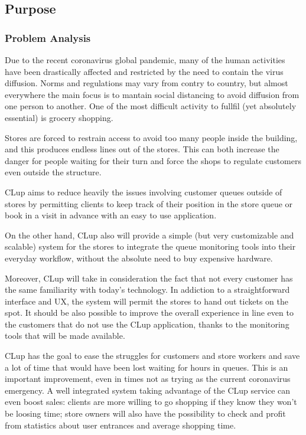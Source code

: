 \subsection{Purpose}

\subsubsection{Problem Analysis}

Due to the recent coronavirus global pandemic, many of the human activities have been drastically affected and restricted by the need to contain the virus diffusion. Norms and regulations may vary from contry to country, but almost everywhere the main focus is to mantain social distancing to avoid diffusion from one person to another.
One of the most difficult activity to fullfil (yet absolutely essential) is grocery shopping.
\medskip

Stores are forced to restrain access to avoid too many people inside the building, and this produces endless lines out of the stores. This can both increase the danger for people waiting for their turn and force the shops to regulate customers even outside the structure.

\medskip

CLup aims to reduce heavily the issues involving customer queues outside of stores by permitting clients to keep track of their position in the store queue or book in a visit in advance with an easy to use application.

\medskip

On the other hand, CLup also will provide a simple (but very customizable and scalable) system for the stores to integrate the queue monitoring tools into their everyday workflow, without the absolute need to buy expensive hardware.

\medskip

Moreover, CLup will take in consideration the fact that not every customer has the same familiarity with today's technology.
In addiction to a straightforward interface and UX, the system will permit the stores to hand out tickets on the spot. It should be also possible to improve the overall experience in line even to the customers that do not use the CLup application, thanks to the monitoring tools that will be made available.

\medskip

CLup has the goal to ease the struggles for customers and store workers and save a lot of time that would have been lost waiting for hours in queues. This is an important improvement, even in times not as trying as the current coronavirus emergency.
A well integrated system taking advantage of the CLup service can even boost sales: clients are more willing to go shopping if they know they won't be loosing time; store owners will also have the possibility to check and profit from statistics about user entrances and average shopping time.

